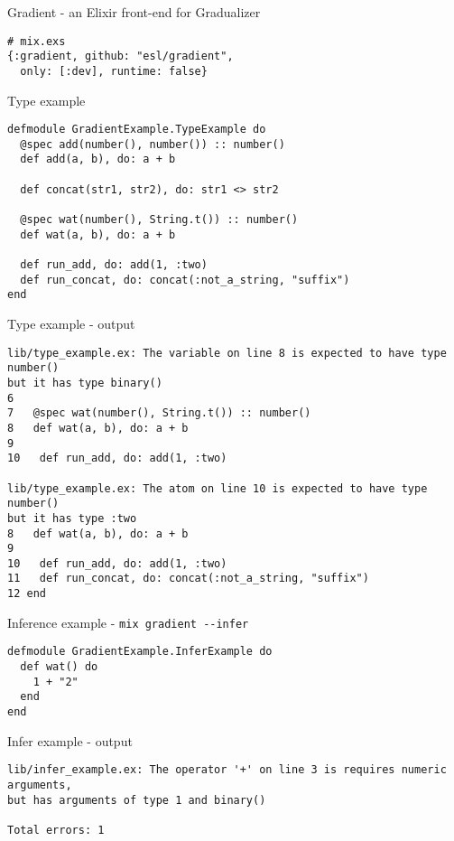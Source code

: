 \documentclass[
  ignorenonframetext,
]{beamer}
\newcommand{\passthrough}[1]{#1}
\begin{document}
\begin{frame}[fragile]{Gradient - an Elixir front-end for Gradualizer}
\protect\hypertarget{gradient---an-elixir-front-end-for-gradualizer}{}
\begin{lstlisting}
# mix.exs
{:gradient, github: "esl/gradient",
  only: [:dev], runtime: false}
\end{lstlisting}
\end{frame}

\begin{frame}[fragile]{Type example}
\protect\hypertarget{type-example-1}{}
\begin{lstlisting}
defmodule GradientExample.TypeExample do
  @spec add(number(), number()) :: number()
  def add(a, b), do: a + b

  def concat(str1, str2), do: str1 <> str2

  @spec wat(number(), String.t()) :: number()
  def wat(a, b), do: a + b

  def run_add, do: add(1, :two)
  def run_concat, do: concat(:not_a_string, "suffix")
end
\end{lstlisting}
\end{frame}

\begin{frame}[fragile]{Type example - output}
\protect\hypertarget{type-example---output}{}
\begin{lstlisting}
lib/type_example.ex: The variable on line 8 is expected to have type number()
but it has type binary()
6
7   @spec wat(number(), String.t()) :: number()
8   def wat(a, b), do: a + b
9
10   def run_add, do: add(1, :two)

lib/type_example.ex: The atom on line 10 is expected to have type number()
but it has type :two
8   def wat(a, b), do: a + b
9
10   def run_add, do: add(1, :two)
11   def run_concat, do: concat(:not_a_string, "suffix")
12 end

\end{lstlisting}
\end{frame}

\begin{frame}[fragile]{Inference example -
\passthrough{\lstinline!mix gradient --infer!}}
\protect\hypertarget{inference-example---mix-gradient---infer}{}
\begin{lstlisting}
defmodule GradientExample.InferExample do
  def wat() do
    1 + "2"
  end
end
\end{lstlisting}
\end{frame}

\begin{frame}[fragile]{Infer example - output}
\protect\hypertarget{infer-example---output}{}
\begin{lstlisting}
lib/infer_example.ex: The operator '+' on line 3 is requires numeric arguments,
but has arguments of type 1 and binary()

Total errors: 1
\end{lstlisting}
\end{frame}
\end{document}

